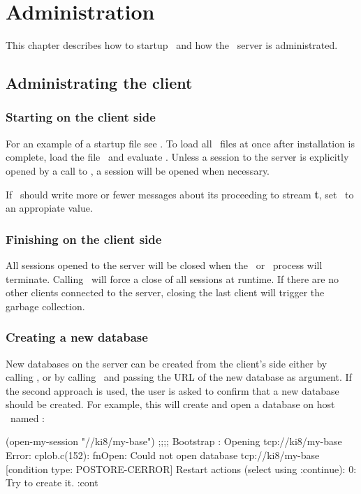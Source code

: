 %

\chapter{Administration}

This chapter describes how to startup \plob\ and how the \plob\ server
is administrated.

\section{Administrating the client}

\subsection{Starting on the client side}%
\label{sec:StartClient}

For an example of a startup file see
.
To load all \plob\ files at once after installation is complete, load
the file \ and evaluate .
Unless a session to the server is explicitly opened by a call to
, a session will be opened when necessary.

If \plob\ should write more or fewer messages about its proceeding to
stream \textbf{t}, set \ to an appropiate value.

\subsection{Finishing on the client side}%
\label{sec:FinishClient}

All sessions opened to the server will be closed when the \lw\ or
\allegro\ process will terminate. Calling \ will
force a close of all sessions at runtime. If there are no other
clients connected to the server, closing the last client will trigger
the garbage collection.

\subsection{Creating a new database}

New databases on the server can be created from the client's side
either by calling , or by calling
\ and passing the URL of the new database as
argument. If the second approach is used, the user is asked to confirm
that a new database should be created. For example, this will create
and open a database on host \ named :
\begin{CompactCode}
\listener{}(open-my-session "//ki8/my-base")
;;;; Bootstrap   : Opening tcp://ki8/my-base
Error: cplob.c(152): fnOpen:
       Could not open database tcp://ki8/my-base
  [condition type: POSTORE-CERROR]
Restart actions (select using :continue):
 0: Try to create it.
\OmitUnimportant
\errlistener{}:cont
\end{CompactCode}

